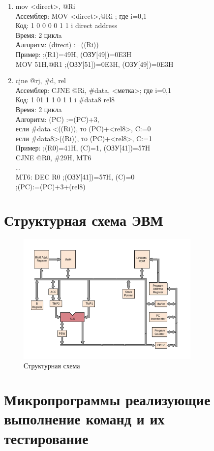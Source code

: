 \begin{enumerate}
\item mov <direct>, @Ri \\
Ассемблер: 	MOV <direct>,@Ri ; где i=0,1 \\
Код:    1 0 0 0 0 1 1 i direct address \\
Время: 	2 циклa \\
Алгоритм: 	(direct) :=((Ri)) \\
Пример: 	        ;(R1)=49H, (ОЗУ[49])=0E3H \\
        MOV 51H,@R1 ;(ОЗУ[51])=0E3H, (ОЗУ[49])=0E3H \\


\item cjne @rj, \#d, rel \\
Ассемблер: 	CJNE @Ri, \#data, <метка>; где i=0,1 \\
Код: 		1 01 1 1 0 1 1 i	\#data8	rel8 \\
Время:		2 циклa \\
Алгоритм: 	(PC) :=(PC)+3, \\
		если \#data <((Ri)), то (PC)+<rel8>, C:=0 \\
		если \#data8>((Ri)), то (PC)+<rel8>, C:=1 \\
Пример: 			;(R0)=41H, (C)=1, (ОЗУ[41])=57H \\
		CJNE @R0, \#29H, MT6 \\
		… \\
		MT6: DEC R0	;(ОЗУ[41])=57H, (C)=0 \\
				;(PC):=(PC)+3+(rel8) \\
\end{enumerate}

\chapter{Структурная схема ЭВМ}
\begin{figure}[h!]
\centering
\includegraphics[width=0.8\textwidth]{res/shema.png}
\caption{Структурная схема}
\end{figure}


\chapter{Микропрограммы реализующие выполнение команд и их тестирование}

